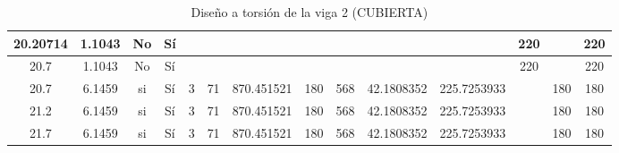 \begin{table}[H]
{\begin{tabular}{|c|c|c|c|c|c|c|c|c|c|c|c|c|c|}
\hline
20.20714 & 1.1043 & No  & Sí  &     &     &     &     &     &     &     & 220 &     & 220 \bigstrut\\
\hline
20.7 & 1.1043 & No  & Sí  &     &     &     &     &     &     &     & 220 &     & 220 \bigstrut\\
\hline
20.7 & 6.1459 & si  & Sí  & 3   & 71  & 870.451521 & 180 & 568 & 42.1808352 & 225.7253933 &     & 180 & 180 \bigstrut\\
\hline
21.2 & 6.1459 & si  & Sí  & 3   & 71  & 870.451521 & 180 & 568 & 42.1808352 & 225.7253933 &     & 180 & 180 \bigstrut\\
\hline
21.7 & 6.1459 & si  & Sí  & 3   & 71  & 870.451521 & 180 & 568 & 42.1808352 & 225.7253933 &     & 180 & 180 \bigstrut\\
\hline
\end{tabular}%

  



  }
      \caption{Diseño a torsión de la viga 2 (CUBIERTA) }
  \label{tab:T VG2 CUB }%
\end{table}%
